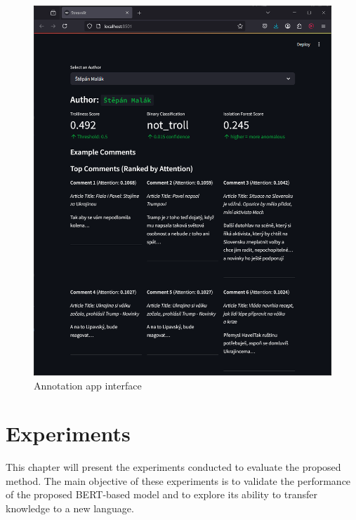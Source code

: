 \documentclass[twoside]{ctuthesis}
\theoremstyle{plain}
\theoremstyle{definition}
\theoremstyle{note}
\begin{document}
\begin{figure}[htbp]          
	\centering                 
	\includegraphics[scale=0.43]{figures/streamlit_app.png}
	\caption{Annotation app interface}    
	\label{fig:my_app}          
\end{figure}

\chapter{Experiments}

This chapter will present the experiments conducted to evaluate the proposed method. The main objective of these experiments is to validate the performance of the proposed BERT-based model and to explore its ability to transfer knowledge to a new language.\par
\end{document}
